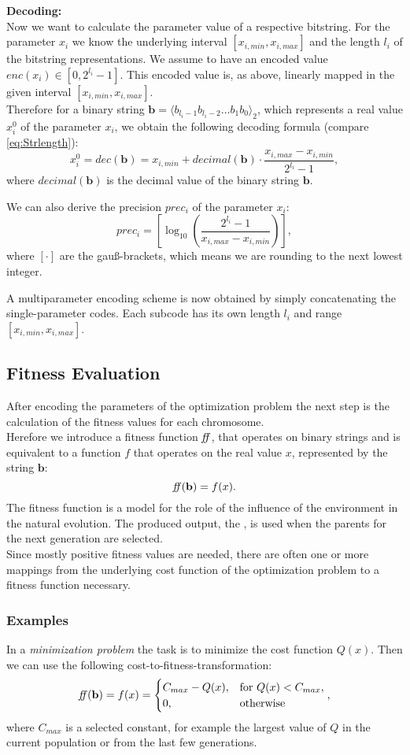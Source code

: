 \textbf{Decoding:}\\
Now we want to calculate the parameter value of a respective bitstring. For the parameter $x_i$ we know the underlying interval $[x_{i,min},x_{i,max}]$ and the length $l_i$ of the bitstring representations. We assume to have an encoded value $enc(x_i)\in[0, 2^{l_i}-1]$. This encoded value is, as above, linearly mapped in the given interval $[x_{i,min},x_{i,max}]$.\\
Therefore for a binary string $\textbf{b}=\langle b_{l_i-1}b_{l_i-2}\ldots b_1b_0 \rangle_2$, which represents a real value $x_i^0$ of the parameter $x_i$, we obtain the following decoding formula (compare \eqref{eq:Strlength}):
\[ x_i^0 = dec(\textbf{b}) = x_{i,min} + decimal(\textbf{b})\cdot\frac{x_{i,max}-x_{i,min}}{2^{l_i}-1}, \]
where $decimal(\textbf{b})$ is the decimal value of the binary string $\textbf{b}$.

We can also derive the precision $prec_i$  of the parameter $x_i$:
\[ prec_i = \left[ \log_{10}\left( \frac{2^{l_i}-1}{x_{i,max}-x_{i,min}} \right) \right], \]
where $[\cdot]$ are the gau\ss-brackets, which means we are rounding to the next lowest integer.

A multiparameter encoding scheme is now obtained by simply concatenating the single-parameter codes. Each subcode has its own length $l_i$ and range $[x_{i,min}, x_{i,max}]$.


\subsection{Fitness Evaluation}
After encoding the parameters of the optimization problem the next step is the calculation of the fitness values for each chromosome.\\
Herefore we introduce a fitness function $\mathit{ff}$, that operates on binary strings and is equivalent to a function $f$ that operates on the real value $x$, represented by the string $\textbf{b}$:
\[ \mathit{ff}(\textbf{b})=f(x). \]
The fitness function is a model for the role of the influence of the environment in the natural evolution. The produced output, the , is used when the parents for the next generation are selected.\\
Since mostly positive fitness values are needed, there are often one or more mappings from the underlying cost function of the optimization problem to a fitness function necessary.\\

\subsubsection*{Examples}
In a \emph{minimization problem} the task is to minimize the cost function $Q(x)$. Then we can use the following cost-to-fitness-transformation:
\[ \mathit{ff}(\textbf{b}) = f(x) = \begin{cases}
C_{max}-Q(x),  &\text{for } Q(x)<C_{max}, \\
0,					&\text{otherwise}
\end{cases},  \]
where $C_{max}$ is a selected constant, for example the largest value of $Q$ in the current population or from the last few generations.

